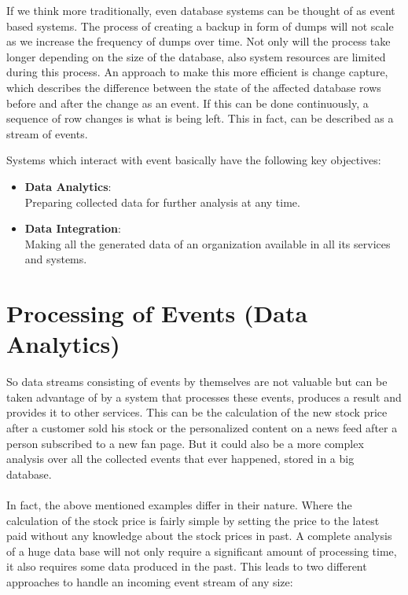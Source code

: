 If we think more traditionally, even database systems can be thought of as
event based systems. The process of creating a backup in form of dumps will not
scale as we increase the frequency of dumps over time. Not only will the process
take longer depending on the size of the database, also system resources are
limited during this process. An approach to make this more efficient
is change capture, which describes the difference between the state of the
affected database rows before and after the change as an event. If this can be done
continuously, a sequence of row changes is what is being left. This in fact,
can be described as a stream of events.

Systems which interact with event basically have the following key objectives: 
\begin{itemize}
    \item {\bf Data Analytics}: \hfill \\ Preparing collected data for further analysis at any time.
    \item {\bf Data Integration}: \hfill \\ Making all the generated data of an
        organization available in all its services and systems.
\end{itemize}

\section{Processing of Events (Data Analytics)}

So data streams consisting of events by themselves are not valuable but
can be taken advantage of by a system that processes these events, produces a
result and provides it to other services. This can be the calculation of the new
stock price after a customer sold his stock or the personalized content on a
news feed after a person subscribed to a new fan page. But it could also be a
more complex analysis over all the collected events that ever happened, stored in
a big database. 
\\ \\
In fact, the above mentioned examples differ in their nature. Where the
calculation of the stock price is fairly simple by setting the price to the
latest paid without any knowledge about the stock prices in past.
A complete analysis of a huge data base will not only require a
significant amount of processing time, it also requires some data produced in the
past. This leads to two different approaches to handle an incoming event stream
of any size: 


